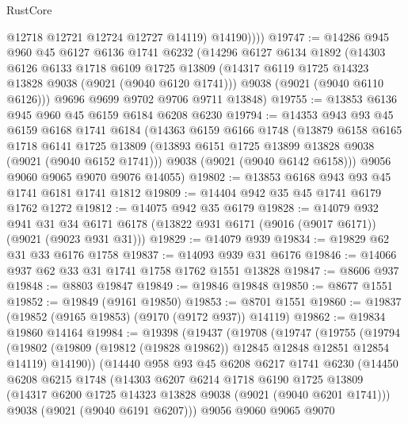 \begin{lexlean}{RustCore}
\begin{coremodule}
              @12718
              @12721
              @12724
              @12727
              @14119)
            @14190))))
@19747 := @14286
    @945
    @960
    @45
    @6127
    @6136
    @1741
    @6232
    (@14296
      @6127
      @6134
      @1892
      (@14303
        @6126
        @6133
        @1718
        @6109
        @1725
        @13809
        (@14317 @6119 @1725 @14323 @13828 @9038 (@9021 (@9040 @6120 @1741)))
        @9038
        (@9021 (@9040 @6110 @6126)))
      @9696
      @9699
      @9702
      @9706
      @9711
      @13848)
@19755 := @13853 @6136 @945 @960 @45 @6159 @6184 @6208 @6230
@19794 := @14353
    @943
    @93
    @45
    @6159
    @6168
    @1741
    @6184
    (@14363
      @6159
      @6166
      @1748
      (@13879
        @6158
        @6165
        @1718
        @6141
        @1725
        @13809
        (@13893 @6151 @1725 @13899 @13828 @9038 (@9021 (@9040 @6152 @1741)))
        @9038
        (@9021 (@9040 @6142 @6158)))
      @9056
      @9060
      @9065
      @9070
      @9076
      @14055)
@19802 := @13853 @6168 @943 @93 @45 @1741 @6181 @1741 @1812
@19809 := @14404 @942 @35 @45 @1741 @6179 @1762 @1272
@19812 := @14075 @942 @35 @6179
@19828 := @14079
    @932
    @941
    @31
    @34
    @6171
    @6178
    (@13822 @931 @6171 (@9016 (@9017 @6171)) (@9021 (@9023 @931 @31)))
@19829 := @14079 @939
@19834 := @19829 @62 @31 @33 @6176 @1758
@19837 := @14093 @939 @31 @6176
@19846 := @14066 @937 @62 @33 @31 @1741 @1758 @1762 @1551 @13828
@19847 := @8606 @937
@19848 := @8803 @19847
@19849 := @19846 @19848
@19850 := @8677 @1551
@19852 := @19849 (@9161 @19850)
@19853 := @8701 @1551
@19860 := @19837 (@19852 (@9165 @19853) (@9170 (@9172 @937)) @14119)
@19862 := @19834 @19860 @14164
@19984 := @19398
    (@19437
      (@19708
        (@19747
          (@19755
            (@19794
              (@19802 (@19809 (@19812 (@19828 @19862)) @12845 @12848 @12851 @12854 @14119) @14190))
            (@14440
              @958
              @93
              @45
              @6208
              @6217
              @1741
              @6230
              (@14450
                @6208
                @6215
                @1748
                (@14303
                  @6207
                  @6214
                  @1718
                  @6190
                  @1725
                  @13809
                  (@14317 @6200 @1725 @14323 @13828 @9038 (@9021 (@9040 @6201 @1741)))
                  @9038
                  (@9021 (@9040 @6191 @6207)))
                @9056
                @9060
                @9065
                @9070

\end{coremodule}
\end{lexlean}
